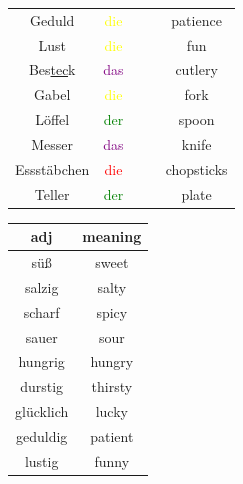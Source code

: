 \begin{center}
\begin{longtable} {|c|c|c|c|c|}
        Geduld                & \textcolor{yellow}{die} &          &                                         & patience               \\
        Lust                  & \textcolor{yellow}{die} &          &                                         & fun                    \\
        \hline
        Bes\underline{tec}k   & \textcolor{purple}{das} &          &                                         & cutlery                \\
        Gabel                 & \textcolor{yellow}{die} &          &                                         & fork                   \\
        Löffel                & \textcolor{green}{der}  &          &                                         & spoon                  \\
        Messer                & \textcolor{purple}{das} &          &                                         & knife                  \\
        Essstäbchen           & \textcolor{red}{die}    &          &                                         & chopsticks             \\
        Teller                & \textcolor{green}{der}  &          &                                         & plate                  \\
        \hline
    \end{longtable}
\end{center}

\begin{center}
    \begin{tabular}{|c|c|}
        \hline
        \rowcolor{gray}
        adj       & meaning \\
        \hline
        süß       & sweet   \\
        salzig    & salty   \\
        scharf    & spicy   \\
        sauer     & sour    \\
        \hline
        hungrig   & hungry  \\
        durstig   & thirsty \\
        glücklich & lucky   \\
        geduldig  & patient \\
        lustig    & funny   \\
        \hline
    \end{tabular}
\end{center}

